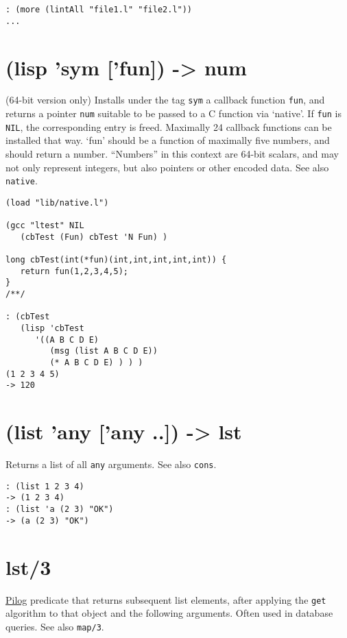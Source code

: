 {{{{{{\begin{verbatim}
: (more (lintAll "file1.l" "file2.l"))
...
\end{verbatim}

 
\section{(lisp 'sym ['fun]) -> num}
\label{sec-8-1-12-18}


(64-bit version only) Installs under the tag \texttt{sym} a callback function
\texttt{fun}, and returns a pointer \texttt{num} suitable to be passed to a C function
via `native'. If \texttt{fun} is \texttt{NIL}, the corresponding entry is freed.
Maximally 24 callback functions can be installed that way. `fun' should
be a function of maximally five numbers, and should return a number.
``Numbers'' in this context are 64-bit scalars, and may not only represent
integers, but also pointers or other encoded data. See also \texttt{native}.


\begin{verbatim}
(load "lib/native.l")

(gcc "ltest" NIL
   (cbTest (Fun) cbTest 'N Fun) )

long cbTest(int(*fun)(int,int,int,int,int)) {
   return fun(1,2,3,4,5);
}
/**/

: (cbTest
   (lisp 'cbTest
      '((A B C D E)
         (msg (list A B C D E))
         (* A B C D E) ) ) )
(1 2 3 4 5)
-> 120
\end{verbatim}

 
\section{(list 'any ['any ..]) -> lst}
\label{sec-8-1-12-19}


Returns a list of all \texttt{any} arguments. See also \texttt{cons}.


\begin{verbatim}
: (list 1 2 3 4)
-> (1 2 3 4)
: (list 'a (2 3) "OK")
-> (a (2 3) "OK")
\end{verbatim}

 
\section{lst/3}
\label{sec-8-1-12-20}


\hyperref[ref.html-pilog]{Pilog} predicate that returns subsequent list
elements, after applying the \texttt{get} algorithm to that object and the
following arguments. Often used in database queries. See also \texttt{map/3}.


}}}}}}
